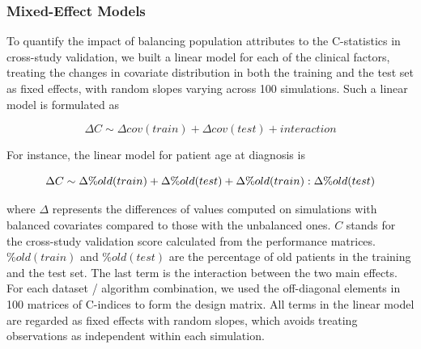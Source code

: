 \documentclass{bioinfo}
\begin{document}
  	\subsubsection{Mixed-Effect Models}
  	To quantify the impact of balancing population attributes to the C-statistics
  	in cross-study validation, we built a linear model for each of the clinical factors, treating the
  	changes in covariate distribution in both the training and the test set 
  	as fixed effects, with random slopes varying across 100 simulations. 
  	Such a linear model is formulated as
  	
  	\begin{equation}\label{linmod}
      \Delta C \sim \Delta cov(train) + \Delta cov(test) + interaction
    \end{equation}
    
    For instance, the linear model for patient age at diagnosis is
  
	
	\begin{equation}
		\footnotesize
		\Delta C \sim \Delta \%old(train) + \Delta \%old(test) + \Delta \%old(train):\Delta \%old(test)
	\end{equation}	
	
	where $\Delta$ represents the differences of values computed on
	simulations with balanced covariates compared to those with the unbalanced ones. $C$ stands for the cross-study validation score 
	calculated from the performance matrices. $\%old(train)$ and $\%old(test)$ are the percentage 
	of old patients in the training and the test set. The last term is the interaction 
	between the two main effects. For each dataset / algorithm combination, we 
	used the off-diagonal elements in 100 matrices of C-indices to form the design matrix. All terms 
	in the linear model are regarded as fixed effects with random slopes, 
	which avoids treating observations as independent within each simulation. %
	
\end{document}
